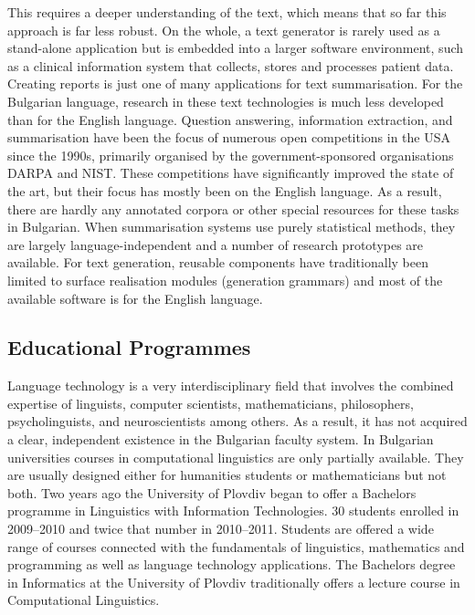 \begin{multicols}{2}

  This requires a deeper understanding of the text, which means that so far this approach is far less robust. On the whole, a text generator is rarely used as a stand-alone application but is embedded into a larger software environment, such as a clinical information system that collects, stores and processes patient data. Creating reports is just one of many applications for text summarisation. 
  For the Bulgarian language, research in these text technologies is much less developed than for the English language. Question answering, information extraction, and summarisation have been the focus of numerous open competitions in the USA since the 1990s, primarily organised by the government-sponsored organisations DARPA and NIST. These competitions have significantly improved the state of the art, but their focus has mostly been on the English language. As a result, there are hardly any annotated corpora or other special resources for these tasks in Bulgarian. When summarisation systems use purely statistical methods, they are largely language-independent and a number of research prototypes are available. For text generation, reusable components have traditionally been limited to surface realisation modules (generation grammars) and most of the available software is for the English language. 

  \subsection{Educational Programmes}

  Language technology is a very interdisciplinary field that involves the combined expertise of linguists, computer scientists, mathematicians, philosophers, psycholinguists, and neuroscientists among others. As a result, it has not acquired a clear, independent existence in the Bulgarian faculty system. In Bulgarian universities courses in computational linguistics are only partially available. They are usually designed either for humanities students or mathematicians but not both. Two years ago the University of Plovdiv began to offer a Bachelors programme in Linguistics with Information Technologies. 30 students enrolled in 2009--2010 and twice that number in 2010--2011. Students are offered a wide range of courses connected with the fundamentals of linguistics, mathematics and programming as well as language technology applications. The Bachelors degree in Informatics at the University of Plovdiv traditionally offers a lecture course in Computational Linguistics. 


\end{multicols}
